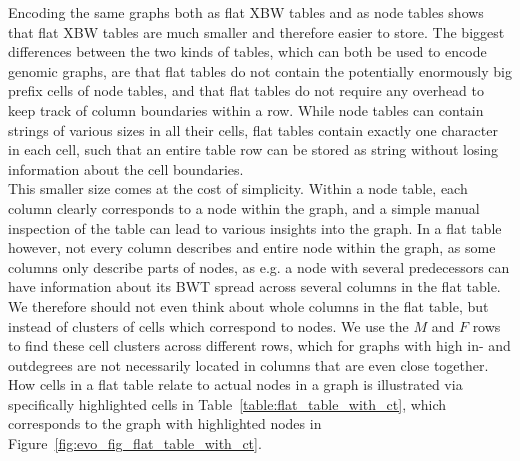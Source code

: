 \documentclass[a4paper,12pt,twoside,BCOR=10mm]{scrbook}
\begin{document}
Encoding the same graphs both as flat XBW tables and as node tables
shows that flat XBW tables are much smaller and therefore easier to store.
The biggest differences between the two kinds of tables,
which can both be used to encode genomic graphs,
are that flat tables do not contain the potentially enormously big prefix cells
of node tables, and that flat tables do not require any overhead to
keep track of column boundaries within a row.
While node tables can contain strings of various sizes in all their cells,
flat tables contain exactly one character in each cell, such that
an entire table row can be stored as string without losing information
about the cell boundaries. \\
This smaller size comes at the cost of simplicity.
Within a node table, each column clearly corresponds to a node within the graph,
and a simple manual inspection of the table can lead to various insights into the graph.
In a flat table however, not every column describes and entire node within the graph,
as some columns only describe parts of nodes, as e.g. a node with several predecessors
can have information about its BWT spread across several columns in the flat table.
We therefore should not even think about whole columns in the flat table,
but instead of clusters of cells which correspond to nodes.
We use the $ M $ and $ F $ rows to
find these cell clusters across different rows, which for graphs with high in- and outdegrees
are not necessarily located in columns that are even close together.
How cells in a flat table relate to actual nodes in a graph is illustrated via specifically highlighted
cells in Table~\ref{table:flat_table_with_ct}, which corresponds to the graph with highlighted nodes
in Figure~\ref{fig:evo_fig_flat_table_with_ct}.
\end{document}
